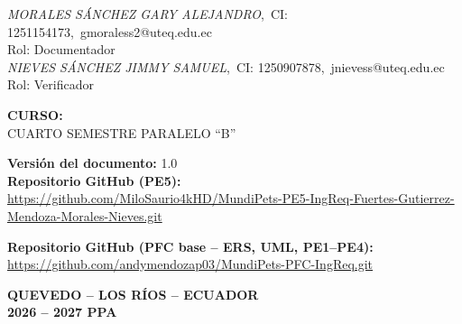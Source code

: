 \documentclass[journal,onecolumn]{IEEEtran}
\begin{document}
\begin{titlepage}
		\textit{MORALES SÁNCHEZ GARY ALEJANDRO},~CI: 1251154173,~gmoraless2@uteq.edu.ec\\
		{\small Rol: Documentador}\\[6pt]
		
		\textit{NIEVES SÁNCHEZ JIMMY SAMUEL},~CI: 1250907878,~jnievess@uteq.edu.ec\\
		{\small Rol: Verificador}
		
		\vspace{0.2cm}
		
		{\normalsize\bfseries CURSO:}\\[4pt]
		{\normalsize CUARTO SEMESTRE PARALELO \enquote{B}}
		
		\vspace{0.2cm}
		
		{\normalsize\bfseries Versión del documento:} 1.0\\[4pt]
		\vspace{0.5cm}
		\textbf{Repositorio GitHub (PE5):}\\
		\url{https://github.com/MiloSaurio4kHD/MundiPets-PE5-IngReq-Fuertes-Gutierrez-Mendoza-Morales-Nieves.git}\\[2pt]

		\vspace{0.5cm}

		\textbf{Repositorio GitHub (PFC base -- ERS, UML, PE1--PE4):}\\
		\url{https://github.com/andymendozap03/MundiPets-PFC-IngReq.git}

		\vspace{1.5cm}
		
		{\normalsize\bfseries QUEVEDO -- LOS RÍOS -- ECUADOR}\\[4pt]
		{\normalsize\bfseries 2026 -- 2027 PPA}
		
	\end{titlepage}
	
	\thispagestyle{fancy}
	
	
	
\end{document}

